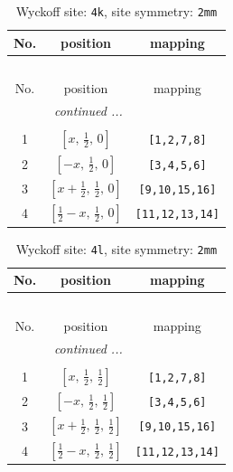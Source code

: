 \documentclass[fleqn,8pt]{jsarticle}
\begin{document}
\renewcommand{\arraystretch}{1.2}
\begin{longtable}{ccc}
\caption{Wyckoff site: {\tt 4k}, site symmetry: {\tt 2mm}}
 \\
 \hline \hline
No. & position & mapping \\ \hline \endfirsthead

\multicolumn{2}{l}{\tablename\ \thetable{}} \\
 \hline \hline
No. & position & mapping \\ \hline \endhead

 \hline \hline
\multicolumn{2}{r}{\footnotesize\it continued ...} \\ \endfoot

 \hline \hline
\multicolumn{2}{r}{} \\ \endlastfoot

1 & $\left[ x,\, \frac{1}{2},\, 0 \right]$ & {\tt [1,2,7,8]} \\ \hline
2 & $\left[ - x,\, \frac{1}{2},\, 0 \right]$ & {\tt [3,4,5,6]} \\ \hline
3 & $\left[ x + \frac{1}{2},\, \frac{1}{2},\, 0 \right]$ & {\tt [9,10,15,16]} \\ \hline
4 & $\left[ \frac{1}{2} - x,\, \frac{1}{2},\, 0 \right]$ & {\tt [11,12,13,14]} \\
\end{longtable}
\renewcommand{\arraystretch}{1.2}
\begin{longtable}{ccc}
\caption{Wyckoff site: {\tt 4l}, site symmetry: {\tt 2mm}}
 \\
 \hline \hline
No. & position & mapping \\ \hline \endfirsthead

\multicolumn{2}{l}{\tablename\ \thetable{}} \\
 \hline \hline
No. & position & mapping \\ \hline \endhead

 \hline \hline
\multicolumn{2}{r}{\footnotesize\it continued ...} \\ \endfoot

 \hline \hline
\multicolumn{2}{r}{} \\ \endlastfoot

1 & $\left[ x,\, \frac{1}{2},\, \frac{1}{2} \right]$ & {\tt [1,2,7,8]} \\ \hline
2 & $\left[ - x,\, \frac{1}{2},\, \frac{1}{2} \right]$ & {\tt [3,4,5,6]} \\ \hline
3 & $\left[ x + \frac{1}{2},\, \frac{1}{2},\, \frac{1}{2} \right]$ & {\tt [9,10,15,16]} \\ \hline
4 & $\left[ \frac{1}{2} - x,\, \frac{1}{2},\, \frac{1}{2} \right]$ & {\tt [11,12,13,14]} \\
\end{longtable}
\end{document}
